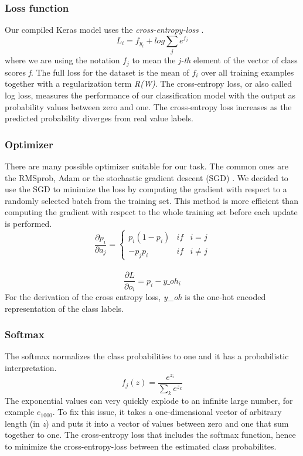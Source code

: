 \documentclass[journal]{IEEEtran}
\begin{document}
\subsubsection{Loss function}
\noindent Our compiled Keras model uses the \textit{cross-entropy-loss} \cite{RN3}. 
\begin{equation}
L_{i} = f_{y_{i}} + log \sum_{j} e^{f_{j}}
\end{equation}
where we are using the notation \(f_{j}\) to mean the \textit{j-th} element of the vector of class scores \textit{f}. The full loss for the dataset is the mean of \(f_{i}\) over all training examples together with a regularization term \textit{R(W)}.
The cross-entropy loss, or also called log loss, measures the performance of our classification model with the output as probability values between zero and one. The cross-entropy loss increases as the predicted probability diverges from real value labels.
\subsubsection{Optimizer}
\noindent There are many possible optimizer suitable for our task. The common ones are the RMSprob, Adam or the stochastic gradient descent (SGD) \cite{RN1}. We decided to use the SGD to minimize the loss by computing the gradient with respect to a randomly selected batch from the training set. This method is more efficient than computing the gradient with respect to the whole training set before each update is performed.
\begin{equation}
\frac{\partial p_i}{\partial a_j}=\left\{\begin{matrix} p_i(1-p_i) & if & i=j\\ -p_j p_i & if & i\neq j \end{matrix}\right.
\end{equation} \\
\begin{equation}
\frac{\partial L}{\partial o_i}=p_i-y\_oh_i
\end{equation} 
For the derivation of the cross entropy loss, \textit{y\_oh} is the one-hot encoded representation of the class labels.
\subsubsection{Softmax}
\noindent The softmax normalizes the class probabilities to one and it has a probabilistic interpretation. 
\begin{equation}
f_{j}(z) = \frac{e^{z_{i}}}{\sum_{k} e^{z_{k}}}
\end{equation}
The exponential values can very quickly explode to an infinite large number, for example \(e_{1000}\). To fix this issue, it takes a one-dimensional vector of arbitrary length (in \textit{z}) and puts it into a vector of values between zero and one that sum together to one. The cross-entropy loss that includes the softmax function, hence to minimize the cross-entropy-loss between the estimated class probabilites. \\
\end{document}
